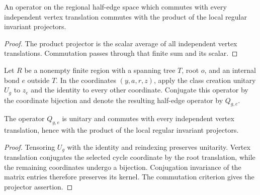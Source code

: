 \begin{lemma}%
    \label{lem:peps_regular_projector_commutation}
    \leanok
    An operator on the regional half-edge space which commutes with
    every independent vertex translation commutes with the product of the
    local regular invariant projectors.
\end{lemma}
\begin{proof}\leanok
    The product projector is the scalar average of all independent vertex
    translations. Commutation passes through that finite sum and its scalar.
\end{proof}

\begin{definition}%
    \label{def:peps_regular_region_flux_creation}
    \leanok
    Let $R$ be a nonempty finite region with a spanning tree $T$, root $o$,
    and an internal bond $e$ outside $T$. In the coordinates $(y,a,r,z)$,
    apply the class creation unitary $U_g$ to $z_e$ and the identity to every
    other coordinate. Conjugate this operator by the coordinate
    bijection and denote the resulting half-edge operator by $Q_{g,e}$.
\end{definition}

\begin{lemma}%
    \label{thm:peps_regular_region_flux_creation_support}
    \leanok
    The operator $Q_{g,e}$ is unitary and commutes with every independent vertex
    translation, hence with the product of the local regular invariant projectors.
\end{lemma}
\begin{proof}\leanok
    Tensoring $U_g$ with the identity and reindexing preserves unitarity.
    Vertex translation conjugates the selected cycle coordinate by the root
    translation, while the remaining coordinates undergo a bijection.
    Conjugation invariance of the matrix entries therefore preserves its kernel.
    The commutation criterion gives the projector assertion.
\end{proof}

